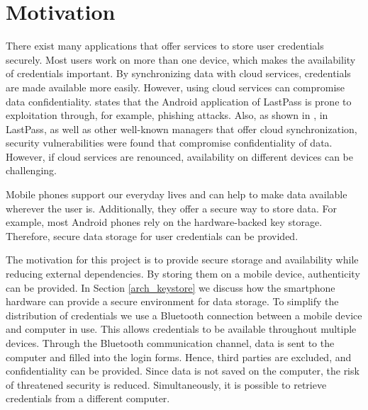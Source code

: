 \section{Motivation} \label{motivation}
There exist many applications that offer services to store user credentials securely. Most users work on more than one device, which makes the availability of credentials important.
By synchronizing data with cloud services, credentials are made available more easily. However, using cloud services can compromise data confidentiality. \cite{AndroidPhishing} states that the Android application of LastPass is prone to exploitation through, for example, phishing attacks. Also, as shown in \cite{PMLeak}, in LastPass, as well as other well-known managers that offer cloud synchronization, security vulnerabilities were found that compromise confidentiality of data. However, if cloud services are renounced, availability on different devices can be challenging.

Mobile phones support our everyday lives and can help to make data available wherever the user is. Additionally, they offer a secure way to store data. For example, most Android phones rely on the hardware-backed key storage. Therefore, secure data storage for user credentials can be provided. 

The motivation for this project is to provide secure storage and availability while reducing external dependencies. By storing them on a mobile device, authenticity can be provided. In Section \ref{arch_keystore} we discuss how the smartphone hardware can provide a secure environment for data storage. To simplify the distribution of credentials we use a Bluetooth connection between a mobile device and computer in use. This allows credentials to be available throughout multiple devices. Through the Bluetooth communication channel, data is sent to the computer and filled into the login forms. Hence, third parties are excluded, and confidentiality can be provided. Since data is not saved on the computer, the risk of threatened security is reduced. Simultaneously, it is possible to retrieve credentials from a different computer. 

